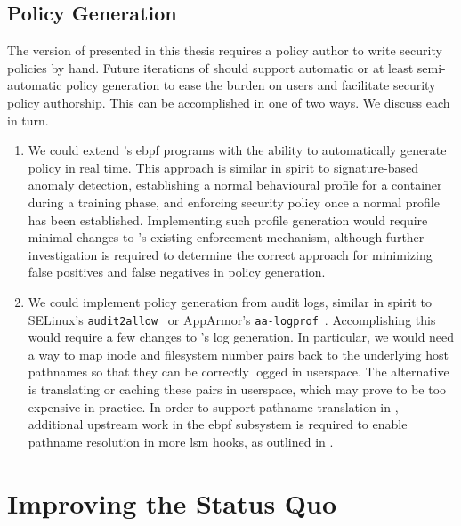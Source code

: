 \subsection{\bpfcontain{} Policy Generation}

The version of \bpfcontain{} presented in this thesis requires a policy author to write
security policies by hand. Future iterations of \bpfcontain{} should support automatic or
at least semi-automatic policy generation to ease the burden on users and facilitate
security policy authorship. This can be accomplished in one of two ways.  We discuss each
in turn.

\begin{enumerate}
  \item We could extend \bpfcontain{}'s \gls{ebpf} programs with the ability to
  automatically generate policy in real time. This approach is similar in spirit to
  signature-based anomaly detection, establishing a normal behavioural profile for
  a container during a training phase, and enforcing security policy once a normal profile
  has been established. Implementing such profile generation would require minimal changes
  to \bpfcontain{}'s existing enforcement mechanism, although further investigation is
  required to determine the correct approach for minimizing false positives and false
  negatives in policy generation.

  \item We could implement policy generation from audit logs, similar in spirit to
  SELinux's \texttt{audit2allow}~\cite{audit2allow} or AppArmor's
  \texttt{aa-logprof}~\cite{aa_logprof}. Accomplishing this would require a few changes to
  \bpfcontain{}'s log generation. In particular, we would need a way to map inode and
  filesystem number pairs back to the underlying host pathnames so that they can be
  correctly logged in userspace.  The alternative is translating or caching these pairs in
  userspace, which may prove to be too expensive in practice.  In order to support
  pathname translation in \bpfcontain{}, additional upstream work in the \gls{ebpf}
  subsystem is required to enable pathname resolution in more \gls{lsm} hooks, as outlined
  in .
\end{enumerate}


\section{Improving the Status Quo}%
\label{s:disc-improving}

